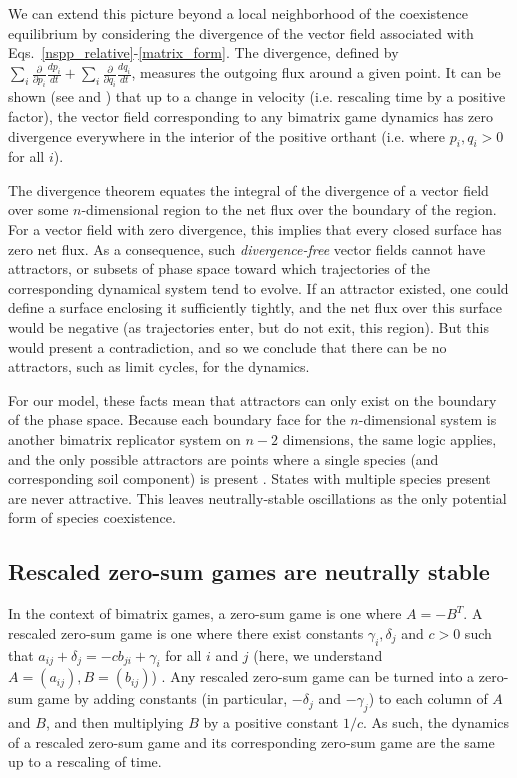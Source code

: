 \documentclass[11pt]{article}
\begin{document}
We can extend this picture beyond a local neighborhood of the coexistence equilibrium by considering the divergence of the vector field associated with Eqs.~\ref{nspp_relative}-\ref{matrix_form}. The divergence, defined by $\sum_i \frac{\partial}{\partial p_i} \frac{dp_i}{dt} + \sum_i \frac{\partial}{\partial q_i} \frac{dq_i}{dt}$, measures the outgoing flux around a given point. It can be shown (see \cite{eshel1983coevolutionary} and \cite{hofbauer1998evolutionary}) that up to a change in velocity (i.e. rescaling time by a positive factor), the vector field corresponding to any bimatrix game dynamics has zero divergence everywhere in the interior of the positive orthant (i.e. where $p_i, q_i > 0$ for all $i$). 

The divergence theorem \cite{arfken1985mathematical} equates the integral of the divergence of a vector field over some $n$-dimensional region to the net flux over the boundary of the region. For a vector field with zero divergence, this implies that every closed surface has zero net flux. As a consequence, such \emph{divergence-free} vector fields cannot have attractors, or subsets of phase space toward which trajectories of the corresponding dynamical system tend to evolve. If an attractor existed, one could define a surface enclosing it sufficiently tightly, and the net flux over this surface would be negative (as trajectories enter, but do not exit, this region). But this would present a contradiction, and so we conclude that there can be no attractors, such as limit cycles, for the dynamics.

For our model, these facts mean that attractors can only exist on the boundary of the phase space. Because each boundary face for the $n$-dimensional system is another bimatrix replicator system on $n-2$ dimensions, the same logic applies, and the only possible attractors are points where a single species (and corresponding soil component) is present \cite{hofbauer1998evolutionary}. States with multiple species present are never attractive. This leaves neutrally-stable oscillations as the only potential form of species coexistence. 

\subsection{Rescaled zero-sum games are neutrally stable}

In the context of bimatrix games, a zero-sum game is one where $A = -B^T$. A rescaled zero-sum game is one where there exist constants $\gamma_i, \delta_j$ and $c > 0$ such that $a_{ij} + \delta_j = -c b_{ji} + \gamma_i$ for all $i$ and $j$ (here, we understand $A = (a_{ij}), B = (b_{ij})$) \cite{hofbauer1998evolutionary}. Any rescaled zero-sum game can be turned into a zero-sum game by adding constants (in particular, $-\delta_j$ and $-\gamma_j$) to each column of $A$ and $B$, and then multiplying $B$ by a positive constant $1 / c$. As such, the dynamics of a rescaled zero-sum game and its corresponding zero-sum game are the same up to a rescaling of time.
\end{document}
